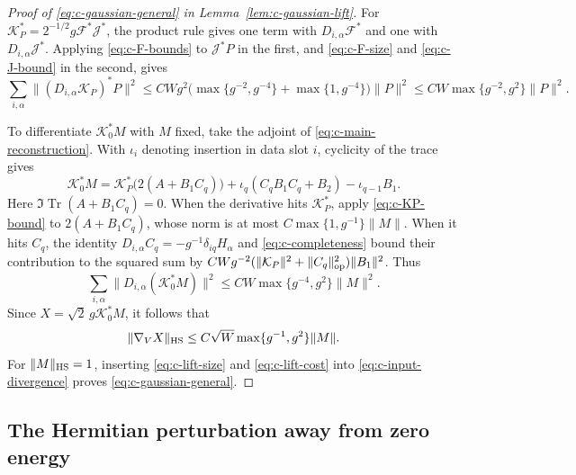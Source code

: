 \documentclass[11pt]{article}
\numberwithin{equation}{section}
\theoremstyle{remark}
\newcommand{\Tr}{\operatorname{Tr}}
\begin{document}
\begin{proof}[Proof of \eqref{eq:c-gaussian-general} in Lemma~\ref{lem:c-gaussian-lift}]
For $\mathcal K_P^*=2^{-1/2}g\mathcal F^*\mathcal J^*$, the product
rule gives one term with $D_{i,\alpha}\mathcal F^*$ and one with
$D_{i,\alpha}\mathcal J^*$. Applying \eqref{eq:c-F-bounds} to
$\mathcal J^*P$ in the first, and \eqref{eq:c-F-size} and
\eqref{eq:c-J-bound} in the second, gives
\begin{equation}\label{eq:c-KP-bound}
 \sum_{i,\alpha}\|(D_{i,\alpha}\mathcal K_P)^*P\|^2
 \le CWg^2\big(\max\{g^{-2},g^{-4}\}+\max\{1,g^{-4}\}\big)\|P\|^2
 \le CW\max\{g^{-2},g^2\}\|P\|^2 .
\end{equation}

To differentiate $\mathcal K_0^*M$ with $M$ fixed, take the adjoint of
\eqref{eq:c-main-reconstruction}. With $\iota_i$ denoting insertion in
data slot $i$, cyclicity of the trace gives
\begin{equation}\label{eq:c-K0-adjoint}
 \mathcal K_0^*M
 =\mathcal K_P^*\bigl(2(A+B_1C_q)\bigr)
       +\iota_q(C_qB_1C_q+B_2)-\iota_{q-1}B_1 .
\end{equation}
Here $\Im\Tr(A+B_1C_q)=0$. When the derivative hits $\mathcal K_P^*$,
apply \eqref{eq:c-KP-bound} to $2(A+B_1C_q)$, whose norm is at most
$C\max\{1,g^{-1}\}\|M\|$. When it hits $C_q$, the identity
$D_{i,\alpha}C_q=-g^{-1}\delta_{iq}H_\alpha$ and \eqref{eq:c-completeness}
bound their contribution to the squared sum by
$CWg^{-2}(\|\mathcal K_P\|^2+\|C_q\|_{\rm op}^2)\|B_1\|^2$. Thus
\[
 \sum_{i,\alpha}\|D_{i,\alpha}(\mathcal K_0^*M)\|^2
 \le CW\max\{g^{-4},g^2\}\|M\|^2 .
\]
Since $X=\sqrt2\,g\mathcal K_0^*M$, it follows that
\begin{equation}\label{eq:c-lift-cost}
 \|\nabla_VX\|_{\rm HS}\le C\sqrt W\max\{g^{-1},g^2\}\|M\|.
\end{equation}
For $\|M\|_{\rm HS}=1$, inserting \eqref{eq:c-lift-size} and
\eqref{eq:c-lift-cost} into \eqref{eq:c-input-divergence} proves
\eqref{eq:c-gaussian-general}.
\end{proof}

\subsection{The Hermitian perturbation away from zero energy}
\end{document}
